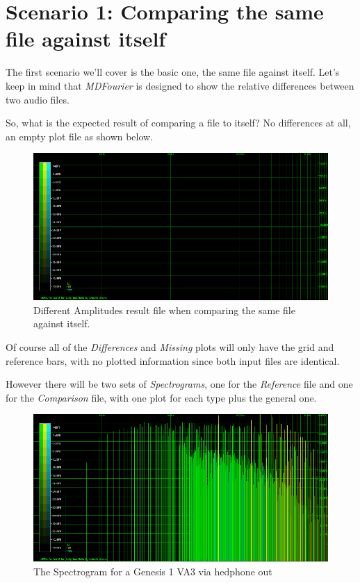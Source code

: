 \documentclass[10pt,a4paper]{report}
\begin{document}
\section{Scenario 1: Comparing the same file against itself}

The first scenario we'll cover is the basic one, the same file against itself. Let's keep in mind that \textit{MDFourier} is designed to show the relative differences between two audio files.

So, what is the expected result of comparing a file to itself? No differences at all, an empty plot file as shown below.

\begin{figure}[H]
	\centering
	\includegraphics[width=1.0\linewidth]{plots/Plot1-SameFile.png}
	\caption[Same file compared]{Different Amplitudes result file when comparing the same file against itself.}
	\label{fig:plot1-samefile}
\end{figure}

Of course all of the \textit{Differences} and \textit{Missing} plots will only have the grid and reference bars, with no plotted information since both input files are identical. 

However there will be two sets of \textit{Spectrograms}, one for the \textit{Reference} file and one for the \textit{Comparison} file, with one plot for each type plus the general one.

\begin{figure}[H]
	\centering
	\includegraphics[width=1.0\linewidth]{plots/Plot2-SameFile-FM-Spectrogram.png}
	\caption[Spectrogram]{The Spectrogram for a Genesis 1 VA3 via hedphone out}
	\label{fig:plot2-samefile-fm-spectrogram}
\end{figure}
\end{document}

